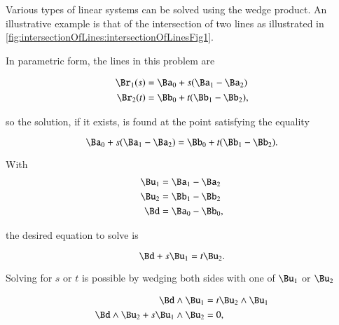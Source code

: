 %
%
Various types of linear systems can be solved using the wedge product.
An illustrative example is that of the intersection of two lines as illustrated in \cref{fig:intersectionOfLines:intersectionOfLinesFig1}.


In parametric form, the lines in this problem are

\begin{dmath}\label{eqn:SimpleProducts2:1000}
\begin{aligned}
\Br_1(s) &= \Ba_0 + s( \Ba_1 - \Ba_2 ) \\
\Br_2(t) &= \Bb_0 + t( \Bb_1 - \Bb_2 ),
\end{aligned}
\end{dmath}

so the solution, if it exists, is found at the point satisfying the equality

\begin{dmath}\label{eqn:SimpleProducts2:1020}
\Ba_0 + s( \Ba_1 - \Ba_2 ) = \Bb_0 + t( \Bb_1 - \Bb_2 ).
\end{dmath}

With
\begin{dmath}\label{eqn:SimpleProducts2:1040}
\begin{aligned}
\Bu_1 &= \Ba_1 - \Ba_2 \\
\Bu_2 &= \Bb_1 - \Bb_2 \\
\Bd &= \Ba_0 - \Bb_0,
\end{aligned}
\end{dmath}

the desired equation to solve is

\begin{dmath}\label{eqn:SimpleProducts2:1060}
\Bd + s \Bu_1 = t \Bu_2.
\end{dmath}

Solving for \( s \) or \( t \) is possible by
wedging both sides with one of \( \Bu_1 \) or \( \Bu_2 \)

\begin{dmath}\label{eqn:SimpleProducts2:1080}
\begin{aligned}
\Bd \wedge \Bu_1 &= t \Bu_2 \wedge \Bu_1 \\
\Bd \wedge \Bu_2 + s \Bu_1 \wedge \Bu_2 &= 0,
\end{aligned}
\end{dmath}

